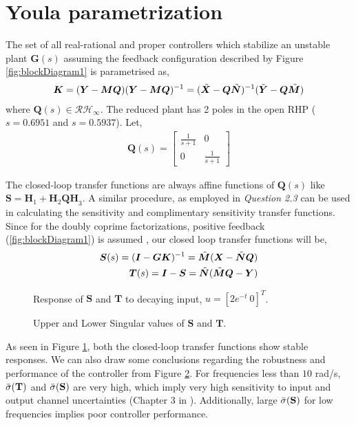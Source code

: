 \section{Youla parametrization}
The set of all real-rational and proper controllers which stabilize an unstable plant $\mathbf{G}(s)$ assuming the feedback configuration described by Figure \ref{fig:blockDiagram1} \cite{Bru87} is parametrised as,
\begin{align*}
    \bm{K} = (\bm{Y}-\bm{MQ})(\bm{Y}-\bm{MQ})^{-1} = (\Tilde{\bm{X}}-\bm{Q}\Tilde{\bm{N}})^{-1}(\Tilde{\bm{Y}}-\bm{Q}\Tilde{\bm{M}})
\end{align*}
where $\mathbf{Q}(s) \in \mathcal{RH}_\infty$. The reduced plant has 2 poles in the open RHP ($s= 0.6951$ and $s = 0.5937$). Let, 
\begin{align*}
    \bm{Q}(s) = 
    \begin{bmatrix}
        \frac{1}{s+1}&0\\
        0&\frac{1}{s+1}
    \end{bmatrix}
\end{align*}

The closed-loop transfer functions are always affine functions of $\mathbf{Q}(s)$ like $\mathbf{S} = \mathbf{H}_1 + \mathbf{H}_2\mathbf{QH}_3$. A similar procedure, as employed in \emph{Question 2.3} can be used in calculating the sensitivity and complimentary sensitivity transfer functions. Since for the doubly coprime factorizations, positive feedback (\ref{fig:blockDiagram1}) is assumed \cite{Bru87}, our closed loop transfer functions will be,
\begin{align*}
    \bm{S}(s) = (\bm{I}-\bm{GK})^{-1} = \Tilde{\bm{M}}(\bm{X}-\Tilde{\bm{N}}\bm{Q})\\
    \bm{T}(s) = \bm{I}-\bm{S} = \Tilde{\bm{N}}(\Tilde{\bm{M}}\bm{Q}-\bm{Y})
\end{align*}
\begin{figure}[h!]
    \centering
    \scalebox{0.7}{
    \begin{tikzpicture}
        
    \end{tikzpicture}}
    \caption{Response of $\mathbf{S}$ and $\mathbf{T}$ to decaying input, $u = [2e^{-t}\: 0]^T$.}
    \label{fig:STRes}
\end{figure}
\begin{figure}[h!]
    \centering
    \scalebox{0.7}{
    \begin{tikzpicture}
        
    \end{tikzpicture}}
    \caption{Upper and Lower Singular values of $\mathbf{S}$ and $\mathbf{T}$.}
    \label{fig:STssv}
\end{figure}
As seen in Figure \ref{fig:STRes}, both the closed-loop transfer functions show stable responses. We can also draw some conclusions regarding the robustness and performance of the controller from Figure \ref{fig:STssv}. For frequencies less than $10$ rad/s, $\Bar{\sigma}(\mathbf{T})$ and $\Bar{\sigma}(\mathbf{S})$ are very high, which imply very high sensitivity to input and output channel uncertainties (Chapter 3 in \cite{Sko05}). Additionally, large $\Bar{\sigma}(\mathbf{S})$ for low frequencies implies poor controller performance. 